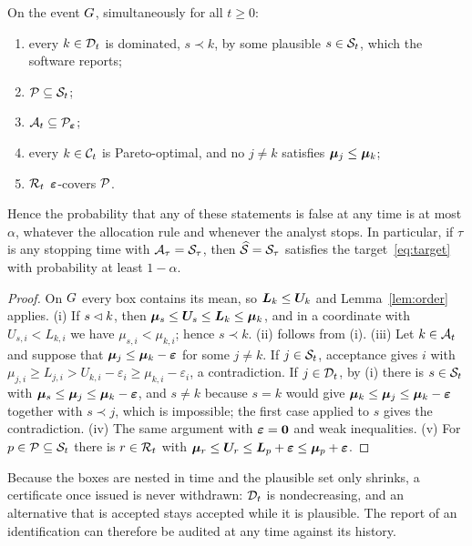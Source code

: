\begin{theorem}\label{thm:validity}
On the event $G$, simultaneously for all $t\ge0$:
\begin{enumerate}[label=(\roman*),leftmargin=*,itemsep=0pt]
\item every $k\in\mathcal{D}_t$ is dominated, $s\prec k$, by some plausible $s\in\mathcal{S}_t$, which the software reports;
\item $\mathcal{P}\subseteq\mathcal{S}_t$;
\item $\mathcal{A}_t\subseteq\mathcal{P}_{\bm{\varepsilon}}$;
\item every $k\in\mathcal{C}_t$ is Pareto-optimal, and no $j\ne k$ satisfies $\bm{\mu}_j\le\bm{\mu}_k$;
\item $\mathcal{R}_t$ $\bm{\varepsilon}$-covers $\mathcal{P}$.
\end{enumerate}
Hence the probability that any of these statements is false at any time is at most $\alpha$, whatever the allocation rule and whenever the analyst stops. In particular, if $\tau$ is any stopping time with $\mathcal{A}_\tau=\mathcal{S}_\tau$, then $\widehat{\mathcal{S}}=\mathcal{S}_\tau$ satisfies the target~\eqref{eq:target} with probability at least $1-\alpha$.
\end{theorem}

\begin{proof}
On $G$ every box contains its mean, so $\bm{L}_k\le\bm{U}_k$ and Lemma~\ref{lem:order} applies. (i) If $s\lhd k$, then $\bm{\mu}_s\le\bm{U}_s\le\bm{L}_k\le\bm{\mu}_k$, and in a coordinate with $U_{s,i}<L_{k,i}$ we have $\mu_{s,i}<\mu_{k,i}$; hence $s\prec k$. (ii) follows from (i). (iii) Let $k\in\mathcal{A}_t$ and suppose that $\bm{\mu}_j\le\bm{\mu}_k-\bm{\varepsilon}$ for some $j\ne k$. If $j\in\mathcal{S}_t$, acceptance gives $i$ with $\mu_{j,i}\ge L_{j,i}>U_{k,i}-\varepsilon_i\ge\mu_{k,i}-\varepsilon_i$, a contradiction. If $j\in\mathcal{D}_t$, by (i) there is $s\in\mathcal{S}_t$ with $\bm{\mu}_s\le\bm{\mu}_j\le\bm{\mu}_k-\bm{\varepsilon}$, and $s\ne k$ because $s=k$ would give $\bm{\mu}_k\le\bm{\mu}_j\le\bm{\mu}_k-\bm{\varepsilon}$ together with $s\prec j$, which is impossible; the first case applied to $s$ gives the contradiction. (iv) The same argument with $\bm{\varepsilon}=\bm0$ and weak inequalities. (v) For $p\in\mathcal{P}\subseteq\mathcal{S}_t$ there is $r\in\mathcal{R}_t$ with $\bm{\mu}_r\le\bm{U}_r\le\bm{L}_p+\bm{\varepsilon}\le\bm{\mu}_p+\bm{\varepsilon}$.
\end{proof}

Because the boxes are nested in time and the plausible set only shrinks, a certificate once issued is never withdrawn: $\mathcal{D}_t$ is nondecreasing, and an alternative that is accepted stays accepted while it is plausible. The report of an identification can therefore be audited at any time against its history.

